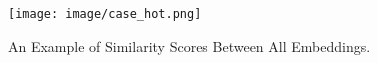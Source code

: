 \begin{figure}[t]
    \centering
    \texttt{[image: image/case\_hot.png]}
    \caption{An Example of Similarity Scores Between All Embeddings.}
    \label{fig:case_hot}
\end{figure}

